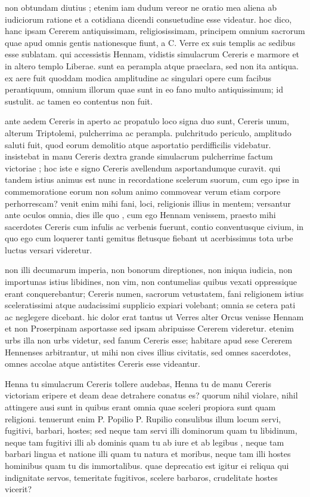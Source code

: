  non obtundam diutius ; etenim iam dudum vereor ne oratio mea aliena ab iudiciorum ratione et a cotidiana dicendi consuetudine esse videatur. hoc dico, hanc ipsam Cererem antiquissimam, religiosissimam, principem omnium sacrorum quae apud omnis gentis nationesque fiunt, a C. Verre ex suis templis ac sedibus esse sublatam. qui accessistis Hennam, vidistis simulacrum Cereris e marmore et in altero templo Liberae. sunt ea perampla atque praeclara, sed non ita antiqua. ex aere fuit quoddam modica amplitudine ac singulari opere cum facibus perantiquum, omnium illorum quae sunt in eo fano multo antiquissimum; id sustulit. ac tamen eo contentus non fuit.

 ante aedem Cereris in aperto ac propatulo loco signa duo sunt, Cereris unum, alterum Triptolemi, pulcherrima ac perampla. pulchritudo periculo, amplitudo saluti fuit, quod eorum demolitio atque asportatio perdifficilis videbatur. insistebat in manu Cereris dextra grande simulacrum pulcherrime factum victoriae ; hoc iste e signo Cereris avellendum asportandumque curavit. qui tandem istius animus est nunc in recordatione scelerum suorum, cum ego ipse in commemoratione eorum non solum animo commovear verum etiam corpore perhorrescam? venit enim mihi fani, loci, religionis illius in mentem; versantur ante oculos omnia, dies ille quo , cum ego Hennam venissem, praesto mihi sacerdotes Cereris cum infulis ac verbenis fuerunt, contio conventusque civium, in quo ego cum loquerer tanti gemitus fletusque fiebant ut acerbissimus tota urbe luctus versari videretur.

 non illi decumarum imperia, non bonorum direptiones, non iniqua iudicia, non importunas istius libidines, non vim, non contumelias quibus vexati oppressique erant conquerebantur; Cereris numen, sacrorum vetustatem, fani religionem istius sceleratissimi atque audacissimi supplicio expiari volebant; omnia se cetera pati ac neglegere dicebant. hic dolor erat tantus ut Verres alter Orcus venisse Hennam et non Proserpinam asportasse sed ipsam abripuisse Cererem videretur. etenim urbs illa non urbs videtur, sed fanum Cereris esse; habitare apud sese Cererem Hennenses arbitrantur, ut mihi non cives illius civitatis, sed omnes sacerdotes, omnes accolae atque antistites Cereris esse videantur.

 Henna tu simulacrum Cereris tollere audebas, Henna tu de manu Cereris victoriam eripere et deam deae detrahere conatus es? quorum nihil violare, nihil attingere ausi sunt in quibus erant omnia quae sceleri propiora sunt quam religioni. tenuerunt enim P. Popilio P. Rupilio consulibus illum locum servi, fugitivi, barbari, hostes; sed neque tam servi illi dominorum quam tu libidinum, neque tam fugitivi illi ab dominis quam tu ab iure et ab legibus , neque tam barbari lingua et natione illi quam tu natura et moribus, neque tam illi hostes hominibus quam tu dis immortalibus. quae deprecatio est igitur ei reliqua qui indignitate servos, temeritate fugitivos, scelere barbaros, crudelitate hostes vicerit?

